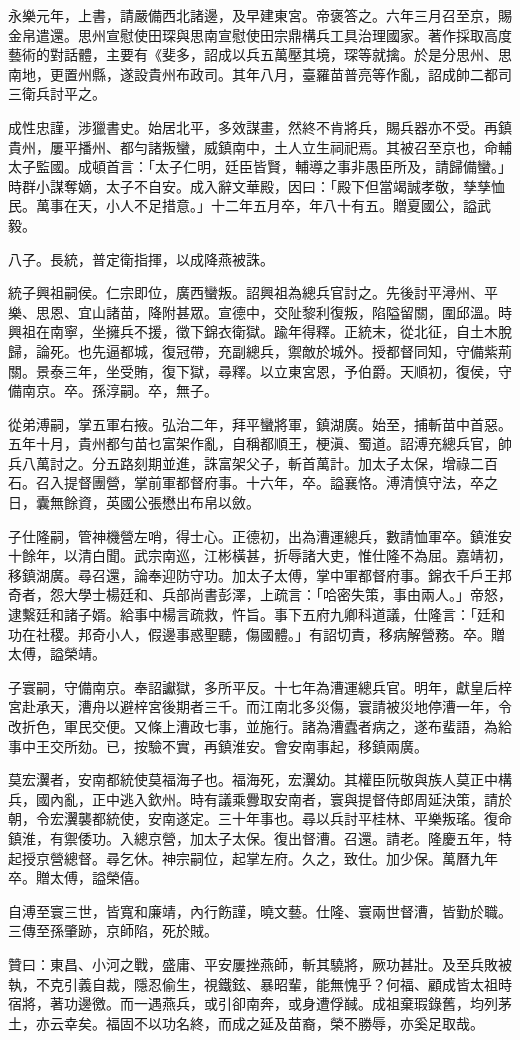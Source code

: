 \begin{pinyinscope}
永樂元年，上書，請嚴備西北諸邊，及早建東宮。帝褒答之。六年三月召至京，賜金帛遣還。思州宣慰使田琛與思南宣慰使田宗鼎構兵工具治理國家。著作採取高度藝術的對話體，主要有《斐多，詔成以兵五萬壓其境，琛等就擒。於是分思州、思南地，更置州縣，遂設貴州布政司。其年八月，臺羅苗普亮等作亂，詔成帥二都司三衛兵討平之。

成性忠謹，涉獵書史。始居北平，多效謀畫，然終不肯將兵，賜兵器亦不受。再鎮貴州，屢平播州、都勻諸叛蠻，威鎮南中，土人立生祠祀焉。其被召至京也，命輔太子監國。成頓首言：「太子仁明，廷臣皆賢，輔導之事非愚臣所及，請歸備蠻。」時群小謀奪嫡，太子不自安。成入辭文華殿，因曰：「殿下但當竭誠孝敬，孳孳恤民。萬事在天，小人不足措意。」十二年五月卒，年八十有五。贈夏國公，謚武毅。

八子。長統，普定衛指揮，以成降燕被誅。

統子興祖嗣侯。仁宗即位，廣西蠻叛。詔興祖為總兵官討之。先後討平潯州、平樂、思恩、宜山諸苗，降附甚眾。宣德中，交阯黎利復叛，陷隘留關，圍邱溫。時興祖在南寧，坐擁兵不援，徵下錦衣衛獄。踰年得釋。正統末，從北征，自土木脫歸，論死。也先逼都城，復冠帶，充副總兵，禦敵於城外。授都督同知，守備紫荊關。景泰三年，坐受賄，復下獄，尋釋。以立東宮恩，予伯爵。天順初，復侯，守備南京。卒。孫淳嗣。卒，無子。

從弟溥嗣，掌五軍右掖。弘治二年，拜平蠻將軍，鎮湖廣。始至，捕斬苗中首惡。五年十月，貴州都勻苗乜富架作亂，自稱都順王，梗滇、蜀道。詔溥充總兵官，帥兵八萬討之。分五路刻期並進，誅富架父子，斬首萬計。加太子太保，增祿二百石。召入提督團營，掌前軍都督府事。十六年，卒。謚襄恪。溥清慎守法，卒之日，囊無餘資，英國公張懋出布帛以斂。

子仕隆嗣，管神機營左哨，得士心。正德初，出為漕運總兵，數請恤軍卒。鎮淮安十餘年，以清白聞。武宗南巡，江彬橫甚，折辱諸大吏，惟仕隆不為屈。嘉靖初，移鎮湖廣。尋召還，論奉迎防守功。加太子太傅，掌中軍都督府事。錦衣千戶王邦奇者，怨大學士楊廷和、兵部尚書彭澤，上疏言：「哈密失策，事由兩人。」帝怒，逮繫廷和諸子婿。給事中楊言疏救，忤旨。事下五府九卿科道議，仕隆言：「廷和功在社稷。邦奇小人，假邊事惑聖聽，傷國體。」有詔切責，移病解營務。卒。贈太傅，謚榮靖。

子寰嗣，守備南京。奉詔讞獄，多所平反。十七年為漕運總兵官。明年，獻皇后梓宮赴承天，漕舟以避梓宮後期者三千。而江南北多災傷，寰請被災地停漕一年，令改折色，軍民交便。又條上漕政七事，並施行。諸為漕蠹者病之，遂布蜚語，為給事中王交所劾。已，按驗不實，再鎮淮安。會安南事起，移鎮兩廣。

莫宏瀷者，安南都統使莫福海子也。福海死，宏瀷幼。其權臣阮敬與族人莫正中構兵，國內亂，正中逃入欽州。時有議乘釁取安南者，寰與提督侍郎周延決策，請於朝，令宏瀷襲都統使，安南遂定。三十年事也。尋以兵討平桂林、平樂叛瑤。復命鎮淮，有禦倭功。入總京營，加太子太保。復出督漕。召還。請老。隆慶五年，特起授京營總督。尋乞休。神宗嗣位，起掌左府。久之，致仕。加少保。萬曆九年卒。贈太傅，謚榮僖。

自溥至寰三世，皆寬和廉靖，內行飭謹，曉文藝。仕隆、寰兩世督漕，皆勤於職。三傳至孫肇跡，京師陷，死於賊。

贊曰：東昌、小河之戰，盛庸、平安屢挫燕師，斬其驍將，厥功甚壯。及至兵敗被執，不克引義自裁，隱忍偷生，視鐵鉉、暴昭輩，能無愧乎？何福、顧成皆太祖時宿將，著功邊徼。而一遇燕兵，或引卻南奔，或身遭俘馘。成祖棄瑕錄舊，均列茅土，亦云幸矣。福固不以功名終，而成之延及苗裔，榮不勝辱，亦奚足取哉。


\end{pinyinscope}